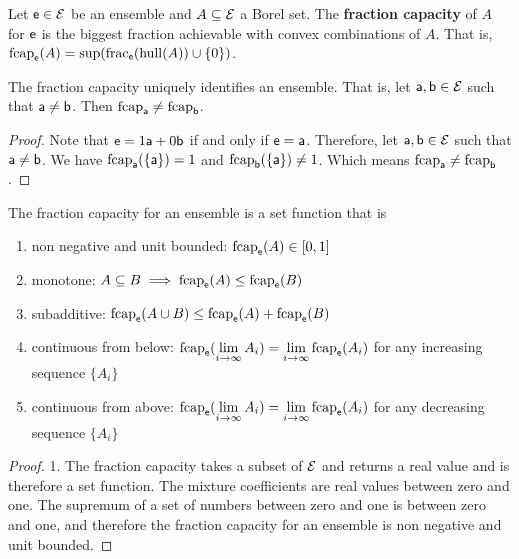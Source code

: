\begin{mathSection}
	\begin{defn}
		Let $\ens \in \Ens$ be an ensemble and $A \subseteq \Ens$ a Borel set. The \textbf{fraction capacity} of $A$ for $\ens$ is the biggest fraction achievable with convex combinations of $A$. That is, $\fcap_{\ens}(A) = \sup(\size_{\ens}(\hull(A))\cup\{0\})$.
	\end{defn}
	
	\begin{coro}
		The fraction capacity uniquely identifies an ensemble. That is, let $\ens[a], \ens[b] \in \Ens$ such that $\ens[a] \neq \ens[b]$. Then $\fcap_{\ens[a]} \neq \fcap_{\ens[b]}$.
	\end{coro}
	
	\begin{proof}
		Note that $\ens = 1 \ens[a] + 0 \ens[b]$ if and only if $\ens = \ens[a]$. Therefore, let $\ens[a], \ens[b] \in \Ens$ such that $\ens[a] \neq \ens[b]$. We have $\fcap_{\ens[a]}(\{\ens[a]\}) = 1$ and $\fcap_{\ens[b]}(\{\ens[a]\}) \neq 1$. Which means $\fcap_{\ens[a]} \neq \fcap_{\ens[b]}$.
	\end{proof}
	
	\begin{prop}
		The fraction capacity for an ensemble is a set function that is
		\begin{enumerate}
			\item non negative and unit bounded: $\fcap_{\ens}(A) \in [0,1]$
			\item monotone: $A \subseteq B \implies \fcap_{\ens}(A) \leq \fcap_{\ens}(B)$
			\item subadditive: $\fcap_{\ens}(A \cup B) \leq \fcap_{\ens}(A) + \fcap_{\ens}(B)$
			\item continuous from below: $\fcap_{\ens}(\lim\limits_{i \to \infty} A_i) = \lim\limits_{i \to \infty} \fcap_{\ens}(A_i)$ for any increasing sequence $\{A_i\}$
			\item continuous from above: $\fcap_{\ens}(\lim\limits_{i \to \infty} A_i) = \lim\limits_{i \to \infty} \fcap_{\ens}(A_i)$ for any decreasing sequence $\{A_i\}$
		\end{enumerate}
	\end{prop}
	
	\begin{proof}
		1. The fraction capacity takes a subset of $\Ens$ and returns a real value and is therefore a set function. The mixture coefficients are real values between zero and one. The supremum of a set of numbers between zero and one is between zero and one, and therefore the fraction capacity for an ensemble is non negative and unit bounded.
		

\end{proof}
\end{mathSection}
